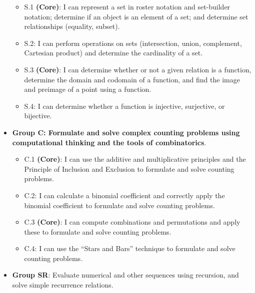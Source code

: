 \documentclass[]{article}
\providecommand{\tightlist}{%
  \setlength{\itemsep}{0pt}\setlength{\parskip}{0pt}}
\begin{document}
\begin{itemize}
  \begin{itemize}
  \tightlist
  \item
    S.1 \textbf{(Core)}: I can represent a set in roster notation and
    set-builder notation; determine if an object is an element of a set;
    and determine set relationships (equality, subset).
  \item
    S.2: I can perform operations on sets (intersection, union,
    complement, Cartesian product) and determine the cardinality of a
    set.
  \item
    S.3 \textbf{(Core)}: I can determine whether or not a given relation
    is a function, determine the domain and codomain of a function, and
    find the image and preimage of a point using a function.
  \item
    S.4: I can determine whether a function is injective, surjective, or
    bijective.
  \end{itemize}
\item
  \textbf{Group C: Formulate and solve complex counting problems using
  computational thinking and the tools of combinatorics}.

  \begin{itemize}
  \tightlist
  \item
    C.1 \textbf{(Core)}: I can use the additive and multiplicative
    principles and the Principle of Inclusion and Exclusion to formulate
    and solve counting problems.
  \item
    C.2: I can calculate a binomial coefficient and correctly apply the
    binomial coefficient to formulate and solve counting problems.
  \item
    C.3 \textbf{(Core)}: I can compute combinations and permutations and
    apply these to formulate and solve counting problems.
  \item
    C.4: I can use the ``Stars and Bars'' technique to formulate and
    solve counting problems.
  \end{itemize}
\item
  \textbf{Group SR}: Evaluate numerical and other sequences using
  recursion, and solve simple recurrence relations.


\end{itemize}
\end{document}
